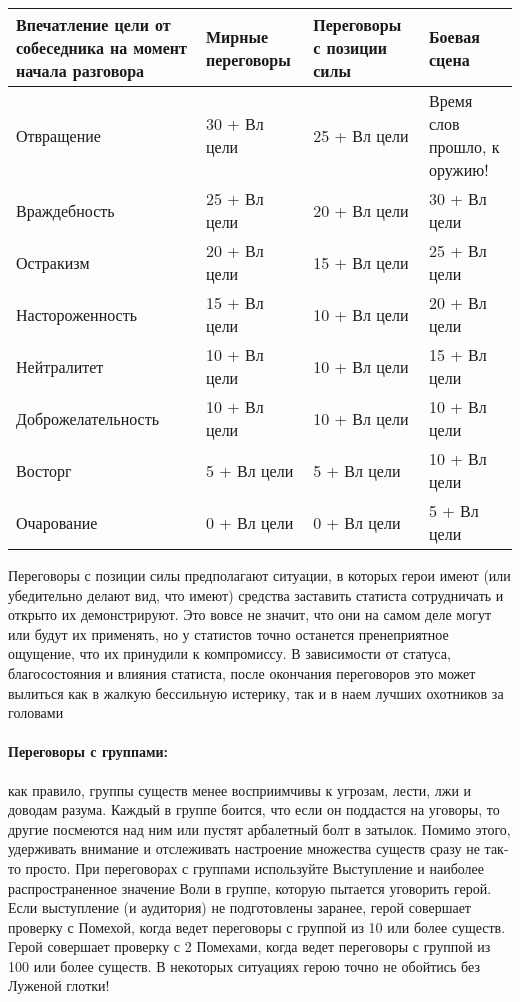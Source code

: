 \begin{center}
\begin{tabular}{|p{6cm}|p{3cm}|p{2.5cm}|p{2.5cm}|}
\hline
Впечатление цели от собеседника на момент начала разговора & Мирные переговоры & Переговоры с позиции силы & Боевая сцена \\ \hline
Отвращение & 30 + Вл цели & 25 + Вл цели & Время слов прошло, к оружию! \\ \hline
Враждебность & 25 + Вл цели & 20 + Вл цели & 30 + Вл цели \\ \hline
Остракизм & 20 + Вл цели & 15 + Вл цели & 25 + Вл цели \\ \hline
Настороженность & 15 + Вл цели & 10 + Вл цели & 20 + Вл цели \\ \hline
Нейтралитет & 10 + Вл цели & 10 + Вл цели & 15 + Вл цели \\ \hline
Доброжелательность & 10 + Вл цели & 10 + Вл цели & 10 + Вл цели \\ \hline
Восторг & 5 + Вл цели & 5 + Вл цели & 10 + Вл цели \\ \hline
Очарование & 0 + Вл цели & 0 + Вл цели & 5 + Вл цели \\ \hline
\end{tabular}
\end{center}
Переговоры с позиции силы предполагают ситуации, в которых герои имеют (или убедительно делают вид, что имеют) средства заставить статиста сотрудничать и открыто их демонстрируют. Это вовсе не значит, что они на самом деле могут или будут их применять, но у статистов точно останется пренеприятное ощущение, что их принудили к компромиссу. В зависимости от статуса, благосостояния и влияния статиста, после окончания переговоров это может вылиться как в жалкую бессильную истерику, так и в наем лучших охотников за головами
\paragraph{Переговоры с группами:} как правило, группы существ менее восприимчивы к угрозам, лести, лжи и доводам разума. Каждый в группе боится, что если он поддастся на уговоры, то другие посмеются над ним или пустят арбалетный болт в затылок. Помимо этого, удерживать внимание и отслеживать настроение множества существ сразу не так-то просто. При переговорах с группами используйте Выступление и наиболее распространенное значение Воли в группе, которую пытается уговорить герой. Если выступление (и аудитория) не подготовлены заранее, герой совершает проверку с Помехой, когда ведет переговоры с группой из 10 или более существ. Герой совершает проверку с 2 Помехами, когда ведет переговоры с группой из 100 или более существ. В некоторых ситуациях герою точно не обойтись без Луженой глотки!

